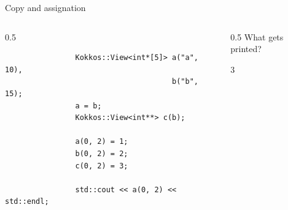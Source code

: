 \documentclass[
    aspectratio=169,
    \createHandout
]{beamer}
\begin{document}

\begin{frame}[fragile]{Copy and assignation}
    \begin{columns}
        \begin{column}{0.5\linewidth}
            \vspace{-0.9em}
            \begin{verbatim}
                Kokkos::View<int*[5]> a("a", 10), 
                                      b("b", 15);
                a = b;
                Kokkos::View<int**> c(b);

                a(0, 2) = 1;
                b(0, 2) = 2;
                c(0, 2) = 3;

                std::cout << a(0, 2) << std::endl;
            \end{verbatim}
        \end{column}
        \begin{column}{0.5\linewidth}
             What gets printed?

            \pause

             3
        \end{column}
    \end{columns}
\end{frame}

\end{document}
